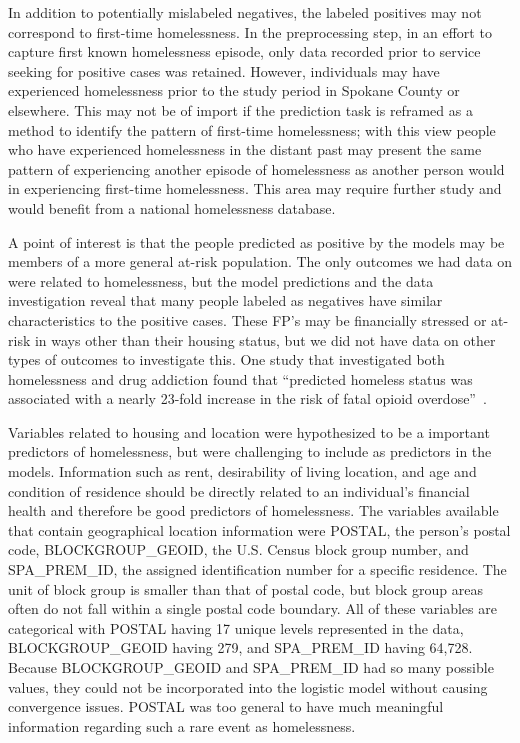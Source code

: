 \documentclass[10pt,letterpaper]{article}
\begin{document}
In addition to potentially mislabeled negatives, the labeled positives may not correspond to first-time homelessness. In the preprocessing step, in an effort to capture first known homelessness episode, only data recorded prior to service seeking for positive cases was retained. However, individuals may have experienced homelessness prior to the study period in Spokane County or elsewhere. This may not be of import if the prediction task is reframed as a method to identify the pattern of first-time homelessness; with this view people who have experienced homelessness in the distant past may present the same pattern of experiencing another episode of homelessness as another person would in experiencing first-time homelessness. This area may require further study and would benefit from a national homelessness database.

A point of interest is that the people predicted as positive by the models may be members of a more general at-risk population. The only outcomes we had data on were related to homelessness, but the model predictions and the data investigation reveal that many people labeled as negatives have similar characteristics to the positive cases. These FP's may be financially stressed or at-risk in ways other than their housing status, but we did not have data on other types of outcomes to investigate this. One study that investigated both homelessness and drug addiction found that ``predicted homeless status was associated with a nearly 23-fold increase in the risk of fatal opioid overdose''~\cite{byrne2020classification}.

Variables related to housing and location were hypothesized to be a important predictors of homelessness, but were challenging to include as predictors in the models. Information such as rent, desirability of living location, and age and condition of residence should be directly related to an individual's financial health and therefore be good predictors of homelessness. The variables available that contain geographical location information were POSTAL, the person's postal code, BLOCKGROUP\_GEOID, the U.S. Census block group number, and SPA\_PREM\_ID, the assigned identification number for a specific residence. The unit of block group is smaller than that of postal code, but block group areas often do not fall within a single postal code boundary. All of these variables are categorical with POSTAL having 17 unique levels represented in the data, BLOCKGROUP\_GEOID having 279, and SPA\_PREM\_ID having 64,728. Because BLOCKGROUP\_GEOID and SPA\_PREM\_ID had so many possible values, they could not be incorporated into the logistic model without causing convergence issues. POSTAL was too general to have much meaningful information regarding such a rare event as homelessness. 
\end{document}
